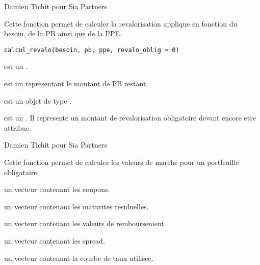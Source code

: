 \documentclass[a4paper]{book}
\begin{document}
%
\begin{Author}\relax
Damien Tichit pour Sia Partners
\end{Author}
%
\begin{Description}\relax
Cette fonction permet de calculer la revalorisation applique en fonction du besoin, de la PB ainsi que de la PPE.
\end{Description}
%
\begin{Usage}
\begin{verbatim}
calcul_revalo(besoin, pb, ppe, revalo_oblig = 0)
\end{verbatim}
\end{Usage}
%
\begin{Arguments}
\begin{ldescription}
\item[\code{besoin}] est un .

\item[\code{pb}] est un  representant le montant de PB restant.

\item[\code{ppe}] est un objet de type .

\item[\code{revalo\_oblig}] est un . Il represente un montant de revalorisation obligatoire devant encore etre attribue.
\end{ldescription}
\end{Arguments}
%
\begin{Author}\relax
Damien Tichit pour Sia Partners
\end{Author}
%
\begin{Description}\relax
Cette fonction permet de calculer les valeurs de marche pour un portfeuille obligataire.
\end{Description}
%
\begin{Arguments}
\begin{ldescription}
\item[\code{coupon}] un vecteur contenant  les coupons.

\item[\code{mat\_res}] un vecteur  contenant les maturites residuelles.

\item[\code{valeur\_remboursement}] un vecteur  contenant les valeurs de remboursement.

\item[\code{spread}] un vecteur  contenant les spread.

\item[\code{yield}] un vecteur contenant la courbe de taux utilisee.
\end{ldescription}
\end{Arguments}
\end{document}
